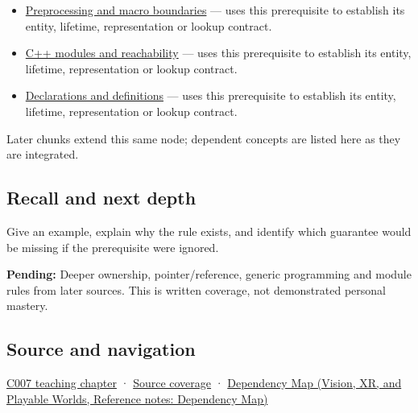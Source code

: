 \hypertarget{appendix-806686359e1b-used-by}{}

\begin{itemize}
\item
  \hyperref[appendix-33c0a92ce855]{Preprocessing and macro boundaries} --- uses this prerequisite to establish its entity, lifetime, representation or lookup contract.
\item
  \hyperref[appendix-410a611a5b8d]{C++ modules and reachability} --- uses this prerequisite to establish its entity, lifetime, representation or lookup contract.
\item
  \hyperref[appendix-2e4d494c2d94]{Declarations and definitions} --- uses this prerequisite to establish its entity, lifetime, representation or lookup contract.
\end{itemize}

Later chunks extend this same node; dependent concepts are listed here as they are integrated.

\subsection{Recall and next depth}\label{appendix-806686359e1b-recall-and-next-depth}

\hypertarget{appendix-806686359e1b-recall-and-next-depth}{}

Give an example, explain why the rule exists, and identify which guarantee would be missing if the prerequisite were ignored.

\textbf{Pending:} Deeper ownership, pointer/reference, generic programming and module rules from later sources. This is written coverage, not demonstrated personal mastery.

\subsection{Source and navigation}\label{appendix-806686359e1b-source-and-navigation}

\hypertarget{appendix-806686359e1b-source-and-navigation}{}

\hyperref[01-foundations-i-ch002-giving-a-program-a-buildable-shape]{C007 teaching chapter} · \hyperref[appendix-fd090d982a15-m007---parts-101-112]{Source coverage} · \href{../07-Vision-XR-and-Playable-Worlds/main.pdf\#nameddest=appendix-4ad47bdd269a}{Dependency Map (Vision, XR, and Playable Worlds, Reference notes: Dependency Map)}
